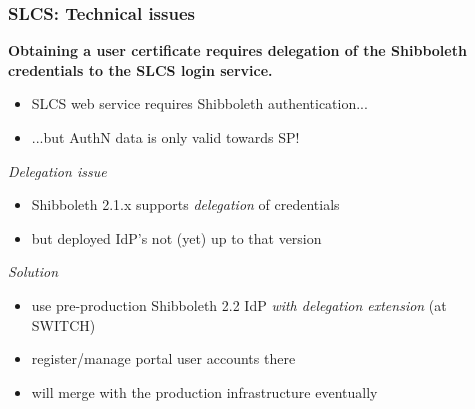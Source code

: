 \documentclass{beamer}
\newcommand{\+}{\vspace{1em}}
\begin{document}
\begin{frame}
  \frametitle{SLCS: Technical issues}
  
  {\bf Obtaining a user certificate requires delegation of the Shibboleth
  credentials to the SLCS login service.}
  \begin{itemize}
  \item SLCS web service requires Shibboleth authentication...
  \item ...but AuthN data is only valid towards SP!
  \end{itemize}

  \+ 
  \emph{Delegation issue}
  \begin{itemize}
  \item Shibboleth 2.1.x supports \emph{delegation} of credentials
  \item but deployed IdP's not (yet) up to that version
  \end{itemize}

  \+
  \emph{Solution}
  \begin{itemize}
  \item use pre-production Shibboleth 2.2 IdP \emph{with delegation extension} (at SWITCH)
  \item register/manage portal user accounts there
  \item will merge with the production infrastructure eventually
  \end{itemize}
\end{frame}
\end{document}
